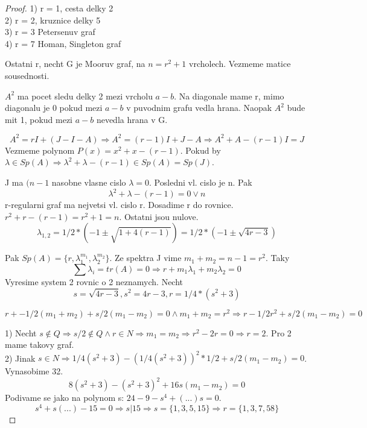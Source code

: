 \begin{proof}
	1) r = 1, cesta delky 2\\
	2) r = 2, kruznice delky 5\\
	3) r = 3 Petersenuv graf\\
	4) r = 7 Homan, Singleton graf

	Ostatni r, necht G je Mooruv graf, na $n = r^2 + 1$ vrcholech. Vezmeme matice sousednosti.

	$A^2$ ma pocet sledu delky 2 mezi vrcholu $a - b$. Na diagonale mame r, mimo diagonalu je 0 pokud mezi $a - b$ v puvodnim grafu vedla hrana. Naopak $A^2$ bude mit 1, pokud mezi $a - b$ nevedla hrana v G.

	\[A^2 = rI + (J - I - A) \Rightarrow A^2 = (r - 1) I + J - A \Rightarrow A^2 + A - (r - 1)I = J \]
	Vezmeme polynom $P(x) = x^2 + x - (r-1)$. Pokud by $\lambda \in Sp(A) \Rightarrow \lambda^2 + \lambda - (r - 1) \in Sp(A) = Sp(J)$.

	J ma $(n-1$ nasobne vlasne cislo $\lambda = 0$. Posledni vl. cislo je n. Pak
	\[ \lambda^2 + \lambda - (r - 1) = 0 \lor n \]
	r-regularni graf ma nejvetsi vl. cislo r. Dosadime r do rovnice. $ r^2 + r - (r - 1) = r^2 + 1 = n $.
	Ostatni jsou nulove.
	\[ \lambda_{1,2} = 1/2 * (-1 \pm \sqrt{1 + 4 (r-1)}) = 1/2 * (-1 \pm \sqrt{4r - 3}) \]

	Pak $ Sp(A) = \{ r, \lambda_1^{m_1}, \lambda_2^{m_2} \} $. Ze spektra J vime $m_1 + m_2 = n-1 = r^2$. Taky
	\[ \sum \lambda_i = tr(A) = 0 \Rightarrow r + m_1 \lambda_1 + m_2 \lambda_2 = 0 \]
	Vyresime system 2 rovnic o 2 neznamych. Necht
	\[s = \sqrt{4r - 3}, s^2 = 4r - 3, r = 1/4 * (s^2 + 3)\]

	\[ r + -1/2 (m_1 + m_2) + s/2 (m_1 - m_2) = 0 \land m_1 + m_2 = r^2 \Rightarrow r - 1/2 r^2 + s/2 (m_1 - m_2) = 0 \]

	1) Necht $s \notin Q \Rightarrow s/2 \notin Q \land r \in N \Rightarrow m_1 = m_2 \Rightarrow r^2 - 2r = 0 \Rightarrow r = 2$. Pro 2 mame takovy graf.\\
	2) Jinak $ s \in N \Rightarrow 1/4 (s^2 + 3) - (1/4 (s^2 + 3))^2 * 1/2 + s/2 (m_1 - m_2) = 0$. Vynasobime 32.
	\[ 8(s^2 + 3) - (s^2 + 3)^2 + 16s(m_1 - m_2) = 0 \]
	Podivame se jako na polynom s: $24 - 9 - s^4 + (...) s = 0$.
	\[ s^4 + s(...) - 15 = 0 \Rightarrow s | 15 \Rightarrow s = \{ 1, 3, 5, 15 \} \Rightarrow r = \{1, 3, 7, 58 \} \]
\end{proof}
